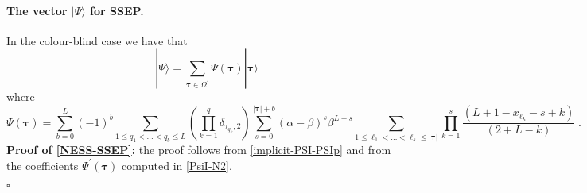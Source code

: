 \documentclass[10pt]{article}
\numberwithin{equation}{section}
\numberwithin{equation}{subsection}
\newcommand{\dt}{\;.}
\begin{document}
\paragraph{The vector $|\Psi\rangle$ for SSEP.}
In the colour-blind case we have that 
\begin{equation}\label{NESS-SSEP}
	|\Psi\rangle=\sum_{\bm{\tau}\in \Omega^{'}}\Psi(\bm{\tau})|\bm{\tau}\rangle
\end{equation}
where
\begin{equation}
	\Psi(\bm{\tau})=\sum_{b=0}^{L}(-1)^{b}\sum_{1\leq q_{1}<\ldots<q_{b}\leq L}\left(\prod_{k=1}^{q}\delta_{\tau_{q_{k}},2}\right)\sum_{s=0}^{|\bm{\tau}|+b}(\alpha-\beta)^{s}\beta^{L-s}\sum_{1\leq \ell_{1}<\ldots<\ell_{s}\leq |\bm{\tau}|}\prod_{k=1}^{s}\frac{\left(L+1-x_{\ell_{k}}-s+k\right)}{(2+L-k)}\dt
\end{equation}
\textbf{Proof of \eqref{NESS-SSEP}:} the proof follows from \eqref{implicit-PSI-PSIp} and from the coefficients $\Psi^{'}(\bm{\tau})$ computed in \eqref{PsiI-N2}. 
\begin{flushright}
	$\square$
\end{flushright}
\begin{comment}
\subsection{Explicit formula for the steady state $|\Psi\rangle$}
{\color{blue}can we proceed as above? uing sth similar to \eqref{goodTP-S2}}

The steady state $|\Psi\rangle$ of the Hamiltonian $H$ is given by 
\begin{equation}\label{steadyStateH}
	|\Psi\rangle=\sum_{\tau_{1},\ldots,\tau_{L}=1}^{N}\Psi(\bm{\tau})|\bm{\tau}\rangle
\end{equation}
where for every $(\tau_{1},\ldots,\tau_{L})=\bm{\tau}$

 Using \eqref{ABS} it is possible to write $\Psi(\bm{\tau})$ explicitly, however to compute correlations it is enough the above expression. We report the explicit formula and the proof in Appendix~\ref{appB}.\\
\\
The state $|\Psi\rangle$ is normalized. To prove it we aim to show that 
\end{comment}
\end{document}
